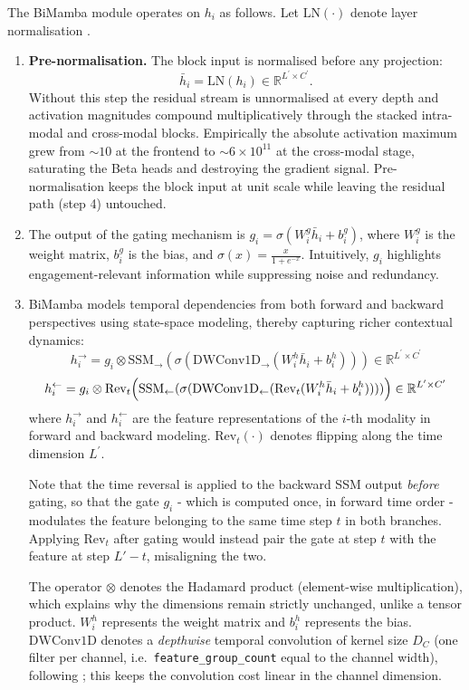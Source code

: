 \documentclass[11pt,a4paper]{article}
\newcommand{\R}{\mathbb{R}}
\begin{document}
	The BiMamba module operates on $h_i$ as follows. Let $\text{LN}(\cdot)$ denote layer normalisation \cite{ba2016layernorm}.
	\begin{enumerate}
		\item \textbf{Pre-normalisation.} The block input is normalised before any projection:
		$$\bar{h}_{i} = \text{LN}(h_{i}) \in \R^{L^{\prime}\times C^{\prime}}.$$
		Without this step the residual stream is unnormalised at every depth and activation magnitudes compound multiplicatively through the stacked intra-modal and cross-modal blocks. Empirically the absolute activation maximum grew from $\sim\!10$ at the frontend to $\sim\!6\times10^{11}$ at the cross-modal stage, saturating the Beta heads and destroying the gradient signal. Pre-normalisation keeps the block input at unit scale while leaving the residual path (step 4) untouched.
		
	    \item The output of the gating mechanism is $g_{i}=\sigma(W_{i}^{g}\bar{h}_{i}+b_{i}^{g})$, where $W_{i}^{g}$ is the weight matrix, $b_{i}^{g}$ is the bias, and $\displaystyle \sigma(x) = \frac{x}{1 + e^{-x}}$. Intuitively, $g_{i}$ highlights engagement-relevant information while suppressing noise and redundancy.
		
		\item BiMamba models temporal dependencies from both forward and backward perspectives using state-space modeling, thereby capturing richer contextual dynamics:
		$$h_{i}^{\rightarrow}=g_{i}\otimes \text{SSM}_{\rightarrow}(\sigma(\text{DWConv1D}_{\rightarrow}(W_{i}^{h}\bar{h}_{i}+b_{i}^{h})))\in\R^{L^{\prime}\times C^{\prime}}$$
		$$h_{i}^{\leftarrow}=g_{i}\otimes \text{Rev}_{t}\Bigl(\text{SSM}_{\leftarrow}(\sigma(\text{DWConv1D}_{\leftarrow}(\text{Rev}_{t}(W_{i}^{h}\bar{h}_{i}+b_{i}^{h}))))\Bigr)\in\R^{L^{\prime}\times C^{\prime}}$$
		where $h_{i}^{\rightarrow}$ and $h_{i}^{\leftarrow}$ are the feature representations of the $i$-th modality in forward and backward modeling. $\text{Rev}_{t}(\cdot)$ denotes flipping along the time dimension $L^{\prime}$.
		
		Note that the time reversal is applied to the backward SSM output \emph{before} gating, so that the gate $g_i$ - which is computed once, in forward time order - modulates the feature belonging to the same time step $t$ in both branches. Applying $\text{Rev}_t$ after gating would instead pair the gate at step $t$ with the feature at step $L'-t$, misaligning the two.
		
		The operator $\otimes$ denotes the Hadamard product (element-wise multiplication), which explains why the dimensions remain strictly unchanged, unlike a tensor product. $W_{i}^{h}$ represents the weight matrix and $b_{i}^{h}$ represents the bias. $\text{DWConv1D}$ denotes a \emph{depthwise} temporal convolution of kernel size $D_C$ (one filter per channel, i.e.\ \texttt{feature\_group\_count} equal to the channel width), following \cite{gu2023mamba}; this keeps the convolution cost linear in the channel dimension.
		

\end{enumerate}
\end{document}
